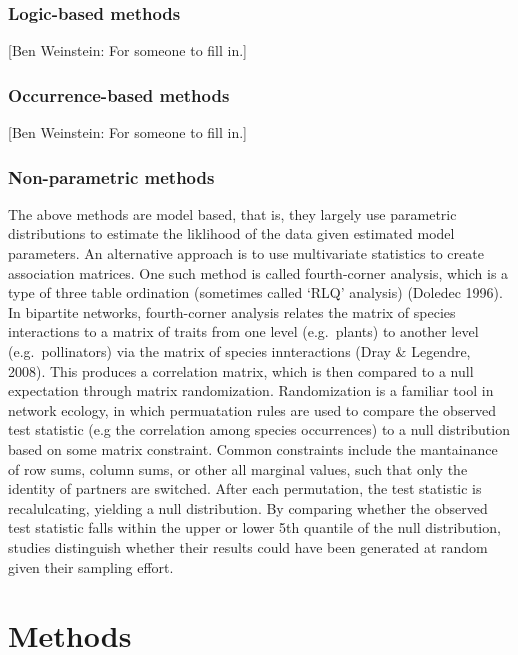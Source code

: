\subsubsection{Logic-based methods}\label{logic-based-methods}

{[}Ben Weinstein: For someone to fill in.{]}

\subsubsection{Occurrence-based methods}\label{occurrence-based-methods}

{[}Ben Weinstein: For someone to fill in.{]}

\subsubsection{Non-parametric methods}\label{non-parametric-methods}

The above methods are model based, that is, they largely use parametric
distributions to estimate the liklihood of the data given estimated model
parameters. An alternative approach is to use multivariate statistics to create
association matrices. One such method is called fourth-corner analysis, which is
a type of three table ordination (sometimes called `RLQ' analysis) (Doledec
1996). In bipartite networks, fourth-corner analysis relates the matrix of
species interactions to a matrix of traits from one level (e.g.~plants) to
another level (e.g.~pollinators) via the matrix of species innteractions (Dray \&
Legendre, 2008). This produces a correlation matrix, which is then compared to a
null expectation through matrix randomization. Randomization is a familiar tool
in network ecology, in which permuatation rules are used to compare the observed
test statistic (e.g the correlation among species occurrences) to a null
distribution based on some matrix constraint. Common constraints include the
mantainance of row sums, column sums, or other all marginal values, such that
only the identity of partners are switched. After each permutation, the test
statistic is recalulcating, yielding a null distribution. By comparing whether
the observed test statistic falls within the upper or lower 5th quantile of the
null distribution, studies distinguish whether their results could have been
generated at random given their sampling effort.

\section{Methods}\label{methods}

